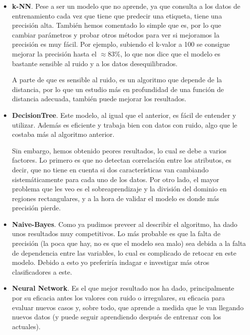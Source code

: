 \documentclass[11pt,a4paper]{article}
\begin{document}
\begin{itemize}
    \item \textbf{k-NN}. Pese a ser un modelo que no aprende, ya que consulta a los datos de entrenamiento cada vez que
          tiene que predecir una etiqueta, tiene una precisión alta. También hemos comentado lo simple que es, por lo que
          cambiar parámetros y probar otros métodos para ver si mejoramos la precisión es muy fácil. Por ejemplo, subiendo
          el k-valor a 100 se consigue mejorar la precisión hasta el $\approx 83\%$, lo que nos dice que el modelo es bastante
          sensible al ruido y a los datos desequilibrados.

          A parte de que es sensible al ruido, es un algoritmo que depende de la distancia, por lo que un estudio más en
          profundidad de una función de distancia adecuada, también puede mejorar los resultados.
    
    \newpage
    \item \textbf{DecisionTree}. Este modelo, al igual que el anterior, es fácil de entender y utilizar. Además es eficiente
          y trabaja bien con datos con ruido, algo que le costaba más al algoritmo anterior.

          Sin embargo, hemos obtenido peores resultados, lo cual se debe a varios factores. Lo primero es que no detectan
          correlación entre los atributos, es decir, que no tiene en cuenta si dos características van cambiando
          sistemáticamente para cada uno de los datos. Por otro lado, el mayor problema que les veo es el sobreaprendizaje
          y la división del dominio en regiones rectangulares, y a la hora de validar el modelo es donde más precisión pierde.

    \item \textbf{Naive-Bayes}. Como ya pudimos preveer al describir el algoritmo, ha dado unos resultados muy competitivos.
          Lo más probable es que la falta de precisión (la poca que hay, no es que el modelo sea malo) sea debida a la falta
          de dependencia entre las variables, lo cual es complicado de retocar en este modelo. Debido a esto yo preferiría
          indagar e investigar más otros clasificadores a este.

    \item \textbf{Neural Network}. Es el que mejor resultado nos ha dado, principalmente por su eficacia antes los valores
          con ruido o irregulares, su eficacia para evaluar nuevos casos y, sobre todo, que aprende a medida que le van
          llegando nuevos datos (y puede seguir aprendiendo después de entrenar con los actuales).


\end{itemize}
\end{document}
